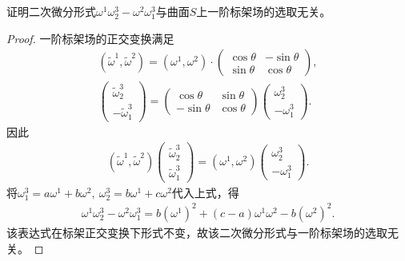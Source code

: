 \documentclass[../../main.tex]{subfiles}%
\begin{document}
\begin{example}
证明二次微分形式$\omega^1\omega_2^3-\omega^2\omega_1^3$与曲面$S$上一阶标架场的选取无关。
\end{example}

\begin{proof}

一阶标架场的正交变换满足
\begin{align*}
(\widetilde{\omega}^1,\widetilde{\omega}^2)=(\omega^1,\omega^2)\cdot\begin{pmatrix}\cos\theta&-\sin\theta\\\sin\theta&\cos\theta\end{pmatrix},\\
\begin{pmatrix}\widetilde{\omega}_2^3\\-\widetilde{\omega}_1^3\end{pmatrix}=\begin{pmatrix}\cos\theta&\sin\theta\\-\sin\theta&\cos\theta\end{pmatrix}\begin{pmatrix}\omega_2^3\\-\omega_1^3\end{pmatrix}.
\end{align*}
因此
\begin{align*}
(\widetilde{\omega}^1,\widetilde{\omega}^2)\begin{pmatrix}\widetilde{\omega}_2^3\\\widetilde{\omega}_1^3\end{pmatrix}=(\omega^1,\omega^2)\begin{pmatrix}\omega_2^3\\-\omega_1^3\end{pmatrix}.
\end{align*}
将$\omega_1^3=a\omega^1+b\omega^2,\ \omega_2^3=b\omega^1+c\omega^2$代入上式，得
\begin{align}
\omega^1\omega_2^3-\omega^2\omega_1^3=b(\omega^1)^2+(c-a)\omega^1\omega^2-b(\omega^2)^2.
\label{eq:invariant-2form}
\end{align}
该表达式在标架正交变换下形式不变，故该二次微分形式与一阶标架场的选取无关。

\end{proof}
\end{document}
